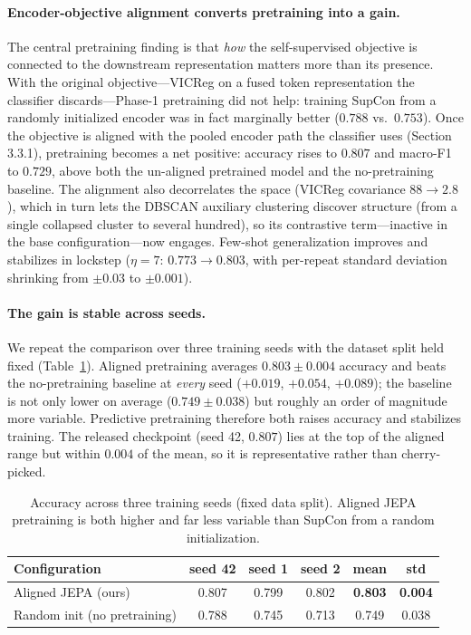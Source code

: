 \documentclass{article}
\begin{document}
\paragraph{Encoder-objective alignment converts pretraining into a gain.} The central pretraining finding is that \emph{how} the self-supervised objective is connected to the downstream representation matters more than its presence. With the original objective---VICReg on a fused token representation the classifier discards---Phase-1 pretraining did not help: training SupCon from a randomly initialized encoder was in fact marginally better ($0.788$ vs.\ $0.753$). Once the objective is aligned with the pooled encoder path the classifier uses (Section 3.3.1), pretraining becomes a net positive: accuracy rises to $0.807$ and macro-F1 to $0.729$, above both the un-aligned pretrained model and the no-pretraining baseline. The alignment also decorrelates the space (VICReg covariance $88 \rightarrow 2.8$), which in turn lets the DBSCAN auxiliary clustering discover structure (from a single collapsed cluster to several hundred), so its contrastive term---inactive in the base configuration---now engages. Few-shot generalization improves and stabilizes in lockstep ($\eta{=}7$: $0.773 \rightarrow 0.803$, with per-repeat standard deviation shrinking from $\pm0.03$ to $\pm0.001$).

\paragraph{The gain is stable across seeds.} We repeat the comparison over three training seeds with the dataset split held fixed (Table~\ref{tab:seeds}). Aligned pretraining averages $0.803 \pm 0.004$ accuracy and beats the no-pretraining baseline at \emph{every} seed ($+0.019$, $+0.054$, $+0.089$); the baseline is not only lower on average ($0.749 \pm 0.038$) but roughly an order of magnitude more variable. Predictive pretraining therefore both raises accuracy and stabilizes training. The released checkpoint (seed 42, $0.807$) lies at the top of the aligned range but within $0.004$ of the mean, so it is representative rather than cherry-picked.

\begin{table}[h]
  \caption{Accuracy across three training seeds (fixed data split). Aligned JEPA pretraining is both higher and far less variable than SupCon from a random initialization.}
  \label{tab:seeds}
  \centering
  \begin{tabular}{lccccc}
    \toprule
    Configuration & seed 42 & seed 1 & seed 2 & mean & std \\
    \midrule
    Aligned JEPA (ours)          & 0.807 & 0.799 & 0.802 & \textbf{0.803} & \textbf{0.004} \\
    Random init (no pretraining) & 0.788 & 0.745 & 0.713 & 0.749 & 0.038 \\
    \bottomrule
  \end{tabular}
\end{table}
\end{document}
